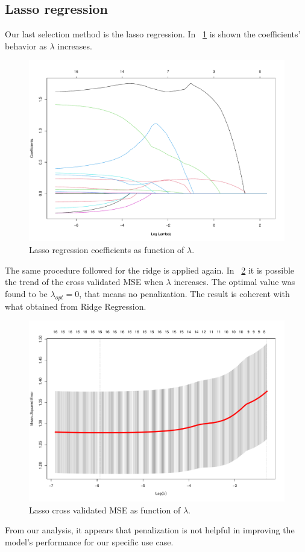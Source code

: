 \subsection{Lasso regression}

Our last selection method is the lasso regression. In \Fig~\ref{fig:LassoCoefVsLambda} is shown the coefficients' behavior as $\lambda$ increases. 

\begin{figure}[H]
	\centering
	\includegraphics[width=0.4\linewidth]{ImageFiles/Regression/Lasso/LassoCoefVsLambda}
	\caption{Lasso regression coefficients as function of $\lambda$.}
	\label{fig:LassoCoefVsLambda}
\end{figure}

The same procedure followed for the ridge is applied again. In \Fig~\ref{fig:LassoCvPlot} it is possible the trend of the cross validated MSE when $\lambda$ increases. The optimal value was found to be $\lambda_{opt} = 0$, that means no penalization. The result is coherent with what obtained from Ridge Regression.

\begin{figure}[H]
	\centering
	\includegraphics[width=0.5\linewidth]{ImageFiles/Regression/Lasso/LassoCvPlot}
	\caption{Lasso cross validated MSE as function of $\lambda$.}
	\label{fig:LassoCvPlot}
\end{figure}

From our analysis, it appears that penalization is not helpful in improving the model's performance for our specific use case.